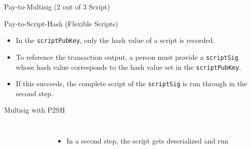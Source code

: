 \documentclass[handout]{beamer}
\begin{document}
\begin{frame}{Pay-to-Multisig (2 out of 3 Script)}
\centering

\end{frame}


\begin{frame}{Pay-to-Script-Hash (Flexible Scripts)}
  \vspace{1em}
\begin{itemize}
  \item<1-> In the \texttt{scriptPubKey}, only the hash value of a script is recorded.
  \item<2-> To reference the transaction output, a person must provide a \texttt{scriptSig} whose hash value corresponds to the hash value set in the \texttt{scriptPubKey}.
  \item<3-> If this succeeds, the complete script of the \texttt{scriptSig} is run through in the second step.
\end{itemize}
\end{frame}


\begin{frame}{Multisig with P2SH}
\begin{columns}
\centering
{}
\begin{figure}
	
\end{figure}
\begin{itemize}
\item<13>{In a second step, the script gets deserialized and run}
\end{itemize}
\end{columns}
\end{frame}
\end{document}
